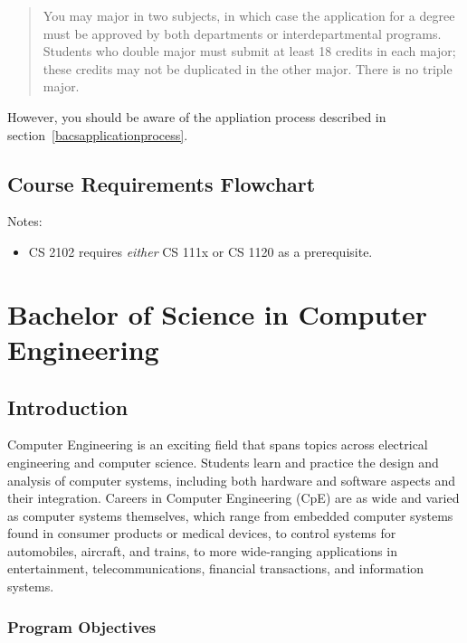 \documentclass[10pt,letter]{book}
\newenvironment{itemlist}{
\begin{itemize}
\setlength{\itemsep}{0pt}
\setlength{\parskip}{0pt}}
{\end{itemize}}
\newcommand{\mychapter}[2]{\chapter{#1}\renewcommand{\leftmark}{\textsc{#2}}}
\newcommand{\mysection}[1]{\section{#1}\renewcommand{\rightmark}{#1}}
\begin{document}
\begin{quotation}
\noindent You may major in two subjects, in which case the application
for a degree must be approved by both departments or inter\-departmental
programs. Students who double major must submit at least 18 credits in
each major; these credits may not be duplicated in the other
major. There is no triple major.
\end{quotation}

However, you should be aware of the appliation process described in
section~\ref{bacsapplicationprocess}.

\mysection{Course Requirements Flowchart}

\begin{figure}[h!]
\end{figure}

\noindent Notes:

\begin{itemlist}
\item CS 2102 requires {\em either} CS 111x or CS 1120 as a
  prerequisite.
\end{itemlist}


\clearpage
\mychapter{Bachelor of Science in Computer Engineering}{BS CpE Degree}

\mysection{Introduction}

Computer Engineering is an exciting field that spans topics across
electrical engineering and computer science.  Students learn and
practice the design and analysis of computer systems, including both
hardware and software aspects and their integration. Careers in
Computer Engineering (CpE) are as wide and varied as computer systems
themselves, which range from embedded computer systems found in
consumer products or medical devices, to control systems for
automobiles, aircraft, and trains, to more wide-ranging applications
in entertainment, telecommunications, financial transactions, and
information systems.


\subsection{Program Objectives}
\end{document}
